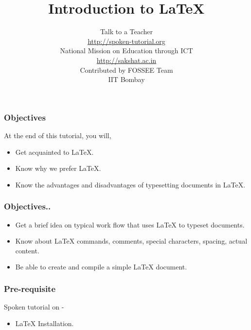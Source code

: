 \documentclass[17pt,compress]{beamer}
\author[FOSSEE]{}
\institute[IIT Bombay]{}
\date[]{}
\begin{document}
\sffamily \bfseries
\title
[Introduction to \LaTeX]
{Introduction to \LaTeX}
\author
[FOSSEE]
{\small Talk to a Teacher\\{\color{blue}\url{http://spoken-tutorial.org}}\\\vspace{0.25cm}National Mission on Education
 through ICT\\{\color{blue}\url{ http://sakshat.ac.in}} \\ [1.65cm]
   Contributed by FOSSEE Team \\IIT Bombay  \\[0.3cm]
}

\begin{frame}
   \titlepage
\end{frame}

\begin{frame}
\frametitle{Objectives}
\label{sec-2}

At the end of this tutorial, you will,
\begin{itemize}
\item Get acquainted to LaTeX.
\item Know why we prefer LaTeX.
\item Know the advantages and disadvantages of typesetting documents in LaTeX.
\end{itemize}
\end{frame}

\begin{frame}
\frametitle{Objectives..}
\label{sec-2}

\begin{itemize}
\item Get a brief idea on typical work flow that uses LaTeX to typeset
documents.
\item Know about LaTeX commands, comments,
      special characters, spacing, actual content.
\item Be able to create and compile a simple LaTeX document.
\end{itemize}
\end{frame}

\begin{frame}
\frametitle{Pre-requisite}
\label{sec-3}

  Spoken tutorial on - 

\begin{itemize}
\item {\LaTeX} Installation.
\end{itemize}
\end{frame}
\end{document}
